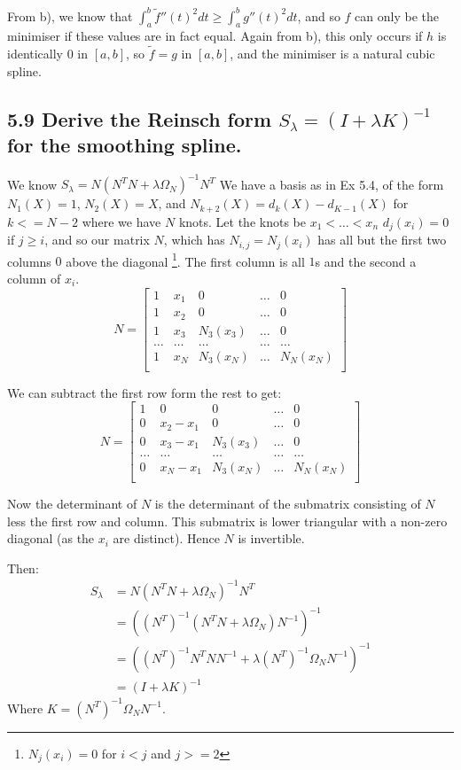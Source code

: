From b), we know that $\int_a^b \tilde{f}''(t)^2 dt \geq \int_a^b g''(t)^2 dt$, and so $f$ can only be the minimiser if these values are in fact equal.
Again from b), this only occurs if $h$ is identically $0$ in $[a,b]$, so $\tilde{f} = g$ in $[a,b]$, and the minimiser is a natural cubic spline.


\subsection*{5.9 Derive the Reinsch form $S_\lambda = \left(I + \lambda K\right) ^{-1}$ for the smoothing spline.}

We know $S_\lambda = N\left(N^T N + \lambda \Omega_N\right)^{-1}N^T$
We have a basis as in Ex 5.4, of the form $N_1(X) = 1$, $N_2(X) = X$, and $N_{k+2}(X) = d_k(X) - d_{K-1}(X)$ for $k <= N-2$ where we have $N$ knots. Let the knots be $x_1 < \dots < x_n$
$d_j(x_i) = 0$ if $j \geq i$, and so our matrix $N$, which has $N_{i,j} = N_j(x_i)$ has all but the first two columns $0$ above the diagonal \footnote{$N_j(x_i) = 0 $ for $i < j$ and $j >= 2$}.
The first column is all $1$s and the second a column of $x_i$.
$$
N = \begin{bmatrix}
1 & x_1 & 0 & \dots & 0\\
1 & x_2 & 0 & \dots & 0\\
1 & x_3 & N_3(x_3) & \dots & 0\\
\dots & \dots & \dots & \dots & \dots\\
1 & x_N & N_3(x_N) & \dots & N_N(x_N)\\
\end{bmatrix}
$$

We can subtract the first row form the rest to get:
$$
N = \begin{bmatrix}
1 & 0 & 0 & \dots & 0\\
0 & x_2 - x_1 & 0 & \dots & 0\\
0 & x_3 - x_1 & N_3(x_3) & \dots & 0\\
\dots & \dots & \dots & \dots & \dots\\
0 & x_N - x_1 & N_3(x_N) & \dots & N_N(x_N)\\
\end{bmatrix}
$$

Now the determinant of $N$ is the determinant of the submatrix consisting of $N$ less the first row and column.
This submatrix is lower triangular with a non-zero diagonal (as the $x_i$ are distinct).
Hence $N$ is invertible.

Then:
\begin{align*}
S_\lambda &= N\left(N^T N + \lambda \Omega_N\right)^{-1}N^T  \\
&= \left((N^T)^{-1} \left( N^T N + \lambda \Omega_N \right) N^{-1}\right)^{-1} \\
&= \left((N^T)^{-1} N^T N N^{-1} + \lambda (N^T)^{-1} \Omega_N  N^{-1}\right)^{-1} \\
&= \left(I + \lambda K \right)^{-1} 
\end{align*}
Where $K = (N^T)^{-1} \Omega_N  N^{-1}$.


